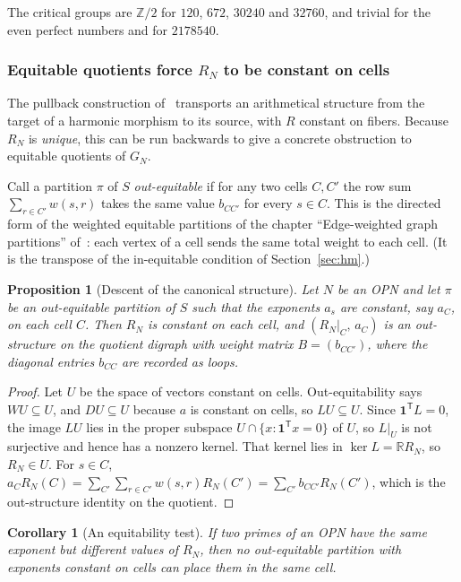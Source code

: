 \documentclass[11pt]{article}
\newtheorem{proposition}[theorem]{Proposition}
\newtheorem{corollary}[theorem]{Corollary}
\theoremstyle{definition}
\theoremstyle{remark}
\newcommand{\one}{\mathbf{1}}
\begin{document}
\noindent
The critical groups are $\mathbb Z/2$ for $120$, $672$, $30240$ and
$32760$, and trivial for the even perfect numbers and for $2178540$.

\subsubsection{Equitable quotients force $R_N$ to be constant on cells}

The pullback construction of~\cite{MJappl} transports an arithmetical
structure from the target of a harmonic morphism to its source, with $R$
constant on fibers.  Because $R_N$ is \emph{unique}, this can be run
backwards to give a concrete obstruction to equitable quotients of $G_N$.

Call a partition $\pi$ of $S$ \emph{out-equitable} if for any two cells
$C,C'$ the row sum $\sum_{r\in C'}w(s,r)$ takes the same value $b_{CC'}$ for
every $s\in C$.  This is the directed form of the weighted equitable
partitions of the chapter ``Edge-weighted graph partitions''
of~\cite{MJappl}: each vertex of a cell sends the same total weight to each
cell.  (It is the transpose of the in-equitable condition of
Section~\ref{sec:hm}.)

\begin{proposition}[Descent of the canonical structure]\label{prop:descent}
Let $N$ be an OPN and let $\pi$ be an out-equitable partition of $S$ such
that the exponents $a_s$ are constant, say $a_C$, on each cell $C$.  Then
$R_N$ is constant on each cell, and $(R_N|_C,\,a_C)$ is an out-structure on
the quotient digraph with weight matrix $B=(b_{CC'})$, where the diagonal
entries $b_{CC}$ are recorded as loops.
\end{proposition}

\begin{proof}
Let $U$ be the space of vectors constant on cells.  Out-equitability says
$WU\subseteq U$, and $DU\subseteq U$ because $a$ is constant on cells, so
$LU\subseteq U$.  Since $\one^{\mathsf T}L=0$, the image $LU$ lies in the
proper subspace $U\cap\{x:\one^{\mathsf T}x=0\}$ of $U$, so $L|_U$ is not
surjective and hence has a nonzero kernel.  That kernel lies in
$\ker L=\mathbb RR_N$, so $R_N\in U$.  For $s\in C$,
$a_C R_N(C)=\sum_{C'}\sum_{r\in C'}w(s,r)R_N(C')=\sum_{C'}b_{CC'}R_N(C')$,
which is the out-structure identity on the quotient.
\end{proof}

\begin{corollary}[An equitability test]
If two primes of an OPN have the same exponent but different values of
$R_N$, then no out-equitable partition with exponents constant on cells can
place them in the same cell.
\end{corollary}
\end{document}
